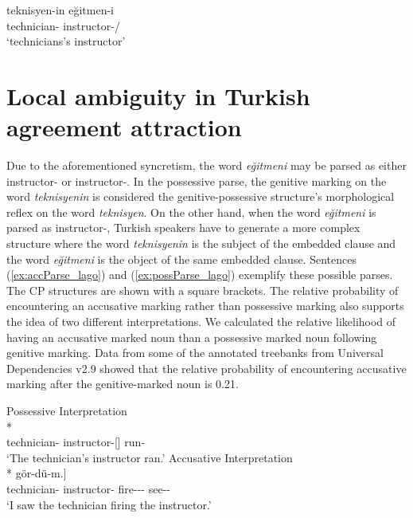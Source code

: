 \ea \label{ex:syncretism}
    \gll teknisyen-in e\u{g}itmen-i\\
    technician-\Gen{} instructor-\Poss{}/\Acc{}\\
    \glt `technicians's instructor'
\z

\section{Local ambiguity in Turkish agreement attraction}

Due to the aforementioned syncretism, the word \emph{e\u{g}itmeni} may be parsed as either instructor-\Poss{} or instructor-\Acc{}. In the possessive parse, the genitive marking on the word \emph{teknisyenin} is considered the genitive-possessive structure's morphological reflex on the word \emph{teknisyen}. On the other hand, when the word \emph{e\u{g}itmeni} is parsed as instructor-\Acc{}, Turkish speakers have to generate a more complex structure where the word \emph{teknisyenin} is the subject of the embedded clause and the word \emph{e\u{g}itmeni} is the object of the same embedded clause. Sentences (\ref{ex:accParse_lago}) and (\ref{ex:possParse_lago}) exemplify these possible parses. The CP structures are shown with a square brackets. The relative probability of encountering an accusative marking rather than possessive marking also supports the idea of two different interpretations. We calculated the relative likelihood of having an accusative marked noun than a possessive marked noun following genitive marking. Data from some of the annotated treebanks from Universal Dependencies v2.9 \citep{TurkEtAl2021,KuzgunEtAl2020,TurkEtAl2019b,SulubacakEtAl2016} showed that the relative probability of encountering accusative marking after the genitive-marked noun is 0.21.

\ea \label{ex:possibleParses}
    \ea \label{ex:possParse_lago} {Possessive Interpretation}\\*
        \\
        \phantom{\normalsize{[\textsubscript{\it \textsc{cp}}}}technician-\Gen{} instructor-\Poss{}[\Nom{}] run-\Pst{}\phantom{]}\\
        \glt `The technician's instructor ran.'
    \ex \label{ex:accParse_lago} {Accusative Interpretation}\\*
        \gll [\textsubscript{\it \textsc{cp}}[\textsubscript{\it \textsc{cp}}Teknisyen-in e\u{g}itmen-i kov-du\u{g}-un-u] g\"{o}r-d\"{u}-m.]\\
        \phantom{\normalsize{[\textsubscript{\it \textsc{cp}}[\textsubscript{\it \textsc{cp}}}}technician-\Gen{} instructor-\Poss{} fire-\Nmlz-\Poss-\Acc{}\phantom{]} see-\Pst-\Fsg{}\phantom{]}\\
        \glt `I saw the technician firing the instructor.'
    \z
\z

